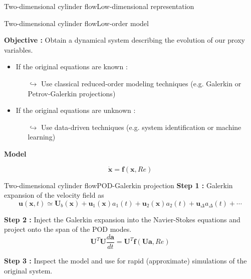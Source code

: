 \documentclass[usenames,dvipsnames,svgnames,10pt,aspectratio=169]{beamer}
\begin{document}
\begin{frame}[t, c]{Two-dimensional cylinder flow}{Low-dimensional representation}
  
\end{frame}




\begin{frame}[t, c]{Two-dimensional cylinder flow}{Low-order model}
  \begin{minipage}{.68\textwidth}
    \begin{tcolorbox}[colframe=beamer@kthblue, colback=white]
      \textbf{Objective :} Obtain a dynamical system describing the evolution of our proxy variables.
    \end{tcolorbox}

    \bigskip

    \begin{itemize}
    \item If the original equations are known :
      \begin{itemize}
      \item[$\hookrightarrow$] Use classical reduced-order modeling techniques (e.g. Galerkin or Petrov-Galerkin projections)
      \end{itemize}

      \medskip

    \item If the original equations are unknown :
      \begin{itemize}
      \item[$\hookrightarrow$] Use data-driven techniques (e.g. system identification or machine learning)
      \end{itemize}
    \end{itemize}
  \end{minipage}%
  \hfill
  \begin{minipage}{.28\textwidth}
    \centering
    \textbf{Model}

    \[
    \dot{\bm{x}} = \bm{f}(\bm{x}, Re)
    \]
  \end{minipage}
\end{frame}





\begin{frame}[t, c]{Two-dimensional cylinder flow}{POD-Galerkin projection}
  \textbf{Step 1 :} Galerkin expansion of the velocity field as
  \[
  \bm{u}(\bm{x}, t) \simeq \bm{U}_b(\bm{x}) + \bm{u}_1(\bm{x}) a_1(t) + \bm{u}_2(\bm{x}) a_2(t) + \bm{u}_{\Delta} a_{\Delta}(t) + \cdots
  \]

  \medskip

  \textbf{Step 2 :} Inject the Galerkin expansion into the Navier-Stokes equations and project onto the span of the POD modes.
  \[
  \bm{U}^T \bm{U} \dfrac{d \bm{a}}{dt} = \bm{U}^T \bm{f}(\bm{Ua}, Re)
  \]

  \medskip

  \textbf{Step 3 :} Inspect the model and use for rapid (approximate) simulations of the original system.
\end{frame}
\end{document}
